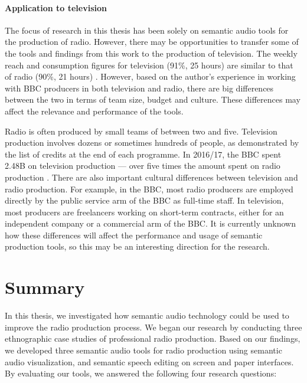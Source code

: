 \paragraph{Application to television}

The focus of research in this thesis has been solely on semantic audio tools for the production of radio. However,
there may be opportunities to transfer some of the tools and findings from this work to the production of television.
The weekly reach and consumption figures for television (91\%, 25 hours) are similar to that of radio (90\%, 21 hours)
\citep[pp.  82, 119]{Ofcom2017}.  However, based on the author's experience in working with BBC producers in both
television and radio, there are big differences between the two in terms of team size, budget and culture. These
differences may affect the relevance and performance of the tools.

Radio is often produced by small teams of between two and five. Television production involves dozens or sometimes
hundreds of people, as demonstrated by the list of credits at the end of each programme.  In 2016/17, the BBC spent
\textsterling2.48B on television production --- over five times the amount spent on radio production \citep[pp.  39,
111]{Ofcom2017}. There are also important cultural differences between television and radio production. For example, in
the BBC, most radio producers are employed directly by the public service arm of the BBC as full-time staff. In
television, most producers are freelancers working on short-term contracts, either for an independent company or a
commercial arm of the BBC.  It is currently unknown how these differences will affect the performance and usage of
semantic production tools, so this may be an interesting direction for the research.





\clearpage
\section{Summary}\label{sec:conclusions-conclusions}

In this thesis, we investigated how semantic audio technology could be used to improve the radio production process.
We began our research by conducting three ethnographic case studies of professional radio production.  Based on our
findings, we developed three semantic audio tools for radio production using semantic audio visualization, and semantic
speech editing on screen and paper interfaces. By evaluating our tools, we answered the following four research
questions: 
\\

